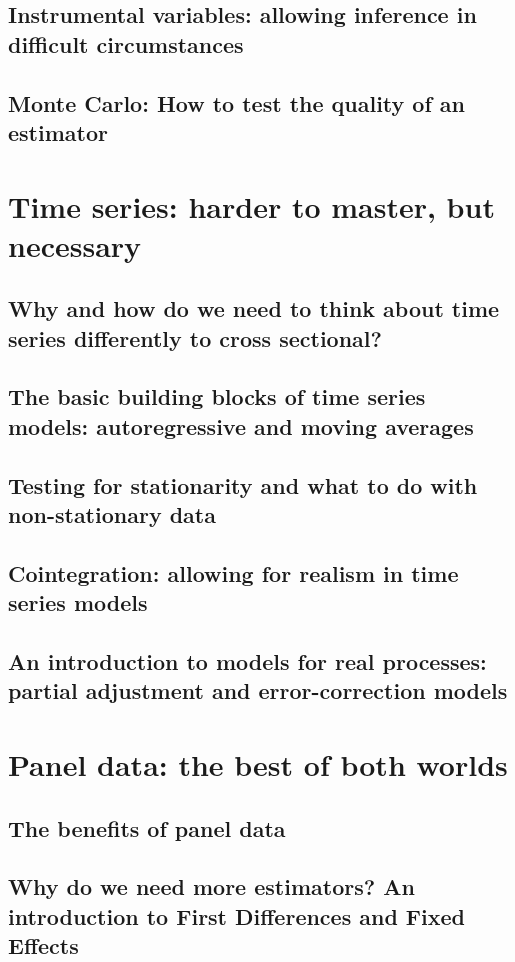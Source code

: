 \documentclass[11pt,fullpage]{book}
\begin{document}
\chapter{Instrumental variables: allowing inference in difficult circumstances}
\chapter{Monte Carlo: How to test the quality of an estimator}

\part{Time series: harder to master, but necessary}
\chapter{Why and how do we need to think about time series differently to cross sectional?}
\chapter{The basic building blocks of time series models: autoregressive and moving averages}
\chapter{Testing for stationarity and what to do with non-stationary data}
\chapter{Cointegration: allowing for realism in time series models}
\chapter{An introduction to models for real processes: partial adjustment and error-correction models}

\part{Panel data: the best of both worlds}
\chapter{The benefits of panel data}
\chapter{Why do we need more estimators? An introduction to First Differences and Fixed Effects}
\end{document}
